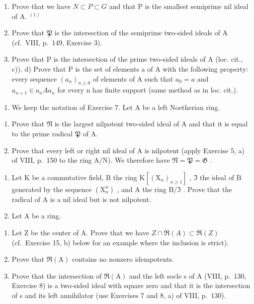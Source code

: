 \begin{enumerate}
\def\labelenumi{\alph{enumi})}
\item
  Prove that we have \(N \subset P \subset G\) and that P is the smallest semiprime nil ideal of A. \(^{(1)}\)
\item
  Prove that \(\mathfrak{P}\) is the intersection of the semiprime two-sided ideals of A (cf.~VIII, p.~149, Exercise 3).
\item
  Prove that P is the intersection of the prime two-sided ideals of A (loc. cit., c)). d) Prove that P is the set of elements a of A with the following property: every sequence \((a_{n})_{n\geqslant0}\) of elements of A such that \(a_{0}=a\) and \(a_{n+1}\in a_{n}Aa_{n}\) for every n has finite support (same method as in loc. cit.).
\end{enumerate}

\begin{enumerate}
\def\labelenumi{\arabic{enumi})}
\setcounter{enumi}{7}
\tightlist
\item
  We keep the notation of Exercise 7. Let A be a left Noetherian ring.
\end{enumerate}

\begin{enumerate}
\def\labelenumi{\alph{enumi})}
\item
  Prove that \(\mathfrak{N}\) is the largest nilpotent two-sided ideal of A and that it is equal to the prime radical \(\mathfrak{P}\) of A.
\item
  Prove that every left or right nil ideal of A is nilpotent (apply Exercise 5, a) of VIII, p.~150 to the ring A/N). We therefore have \(\mathfrak{N} = \mathfrak{P} = \mathfrak{G}\) .
\end{enumerate}

\begin{enumerate}
\def\labelenumi{\arabic{enumi})}
\setcounter{enumi}{8}
\item
  Let \(\mathrm{K}\) be a commutative field, \(\mathrm{B}\) the ring \(\mathrm{K}[(\mathrm{X}_n)_{n\geqslant 1}]\) , \(\mathfrak{I}\) the ideal of \(\mathrm{B}\) generated by the sequence \((\mathrm{X}_n^n)\) , and \(\mathrm{A}\) the ring \(\mathrm{B} / \mathfrak{I}\) . Prove that the radical of \(\mathrm{A}\) is a nil ideal but is not nilpotent.
\item
  Let A be a ring.
\end{enumerate}

\begin{enumerate}
\def\labelenumi{\alph{enumi})}
\item
  Let Z be the center of A. Prove that we have \(Z \cap \Re(A) \subset \Re(Z)\) (cf.~Exercise 15, b) below for an example where the inclusion is strict).
\item
  Prove that \(\Re(\mathrm{A})\) contains no nonzero idempotents.
\item
  Prove that the intersection of \(\Re(\mathrm{A})\) and the left socle s of A (VIII, p.~130, Exercise 8) is a two-sided ideal with square zero and that it is the intersection of s and its left annihilator (use Exercises 7 and 8, a) of VIII, p.~130).
\end{enumerate}

